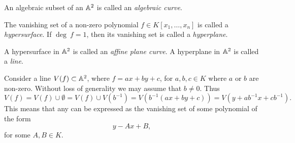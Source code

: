 \begin{definition}
    An algebraic subset of an $\mathbb{A}^2$ is called an \textit{algebraic curve}.
\end{definition}
\begin{definition}
    The vanishing set of a non-zero polynomial $f\in K[x_1,\dots,x_n]$ is called a \textit{hypersurface}. If $\deg \ f = 1$, then its vanishing set is called a \textit{hyperplane}. 
\end{definition}
\begin{definition}
    A hypersurface in $\mathbb{A}^2$ is called an \textit{affine plane curve}. A hyperplane in $\mathbb{A}^2$ is called a \textit{line}.
\end{definition}
\begin{remark}
    Consider a line $V(f)\subset \mathbb{A}^2$, where $f=ax+by+c$, for $a,b,c\in K$ where $a$ or $b$ are non-zero. Without loss of generality we may assume that $b\neq 0$. Thus 
    $$V(f)= V(f)\cup \emptyset = V(f)\cup V\left(b^{-1}\right) = V\left(b^{-1}(ax+by+c)\right)=V\left(y+ab^{-1}x+cb^{-1}\right).$$
    This means that any can be expressed as the vanishing set of some polynomial of the form 
    $$y-Ax+B,$$
    for some $A,B\in K.$
\end{remark}

